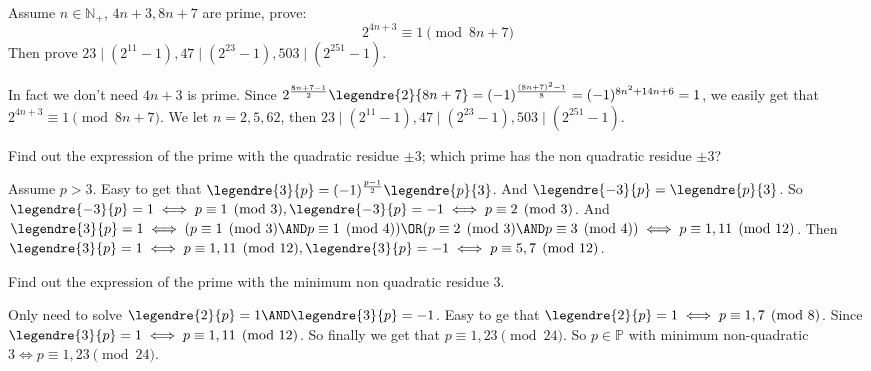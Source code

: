 \documentclass{ctexart}
\begin{document}
\begin{problem}\label{pro:3}
  Assume \(n \in \mathbb{N}_+\), \(4n + 3,8n + 7\) are prime, prove:
  \[
    2^{4n + 3}\equiv 1 \pmod{8n + 7}
  \]
  Then prove \(23 \mid(2^{11}-1),47 \mid (2^{23}-1),503 \mid (2^{251}-1)\).
\end{problem}
\begin{solution}
  In fact we don't need \(4n + 3\) is prime. Since \(2^{\frac{8n + 7-1}{2}}\legendre{2}{8n + 7}=(-1)^{\frac{(8n + 7)^2-1}{8}}=(-1)^{8n^2 + 14n + 6}=1\),
  we easily get that \(2^{4n + 3} \equiv 1 \pmod{8n + 7}\). We let \(n = 2,5,62\), then \(23 \mid (2^{11}-1), 47 \mid (2^{23}-1),503 \mid(2^{251}-1)\).
\end{solution}

\begin{problem}\label{pro:4}
  Find out the expression of the prime with the quadratic residue \(\pm 3\);
  which prime has the non quadratic residue \(\pm 3\)?
\end{problem}
\begin{solution}
  Assume \(p > 3\). Easy to get that \(\legendre{3}{p}=(-1)^{\frac{p-1}{2}}\legendre{p}{3}\).
  And \(\legendre{-3}{p}=\legendre{p}{3}\). So \(\legendre{-3}{p}=1 \iff p \equiv 1 \pmod{3}, \legendre{-3}{p}=-1 \iff p \equiv 2 \pmod{3}\).
  And \(\legendre{3}{p}=1 \iff (p \equiv 1 \pmod{3} \AND p \equiv 1 \pmod{ 4}) \OR (p \equiv 2 \pmod{3} \AND p \equiv 3 \pmod{ 4}) \iff p \equiv 1,11 \pmod{ 12}\).
  Then \(\legendre{3}{p}=1 \iff p \equiv 1,11 \pmod{12}, \legendre{3}{p}=-1 \iff p \equiv 5,7 \pmod{12}\).
\end{solution}

\begin{problem}\label{pro:5}
  Find out the expression of the prime with the minimum non quadratic residue \( 3\).
\end{problem}
\begin{solution}
  Only need to solve \(\legendre{2}{p}=1 \AND \legendre{3}{p}=-1\). Easy to ge that \(\legendre{2}{p}=1 \iff p \equiv 1,7 \pmod{8}\).
  Since \(\legendre{3}{p}=1 \iff p \equiv 1, 11 \pmod{12}\). So finally we get that \(p \equiv 1,23 \pmod{24}\).
  So \(p \in \mathbb{P}\) with minimum non-quadratic \(3 \iff p \equiv 1,23 \pmod{24}\).
\end{solution}
\end{document}

